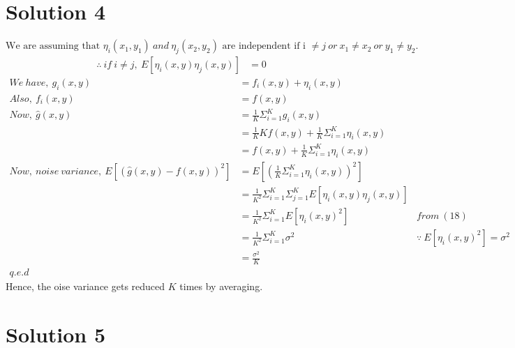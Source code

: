 \documentclass[a4paper,fleqn,11pt]{article}
\theoremstyle{mytheor}
\begin{document}
\section*{Solution 4}
$\text{We are assuming that }\eta_i (x_1, y_1)\ and\ \eta_j (x_2, y_2)\text{ are independent if i }\neq j\ or\ x_1 \neq x_2\ or\ y_1 \neq y_2.$
\begin{align}
\therefore\ if\ i \neq j,\ E[\eta_i(x, y)\eta_j(x, y)] & = 0
\end{align}
\begin{align*}
We\ have,\ g_i(x, y) & = f_i(x, y) + \eta_i(x, y) \\
Also,\ f_i(x, y) & = f(x, y) \\
Now,\ \hat{g}(x, y)& = \frac{1}{K} \Sigma_{i = 1}^K g_i(x, y) \\
& = \frac{1}{K}K f(x, y) + \frac{1}{K}\Sigma_{i = 1}^K \eta_i(x, y) \\
& = f(x, y) + \frac{1}{K}\Sigma_{i = 1}^K \eta_i(x, y) \\
Now,\ noise\ variance,\ E[(\hat{g}(x, y) - f(x, y))^2] & = E[(\frac{1}{K}\Sigma_{i = 1}^K \eta_i(x, y))^2] \\
& = \frac{1}{K^2}\Sigma_{i = 1}^K\Sigma_{j = 1}^K E[\eta_i(x, y)\eta_j(x, y)] \\
& = \frac{1}{K^2}\Sigma_{i = 1}^K E[\eta_i(x, y)^2] & from\ (18) \\
& = \frac{1}{K^2}\Sigma_{i = 1}^K \sigma^2 & \because\ E[\eta_i(x, y)^2] = \sigma^2 \\
& = \frac{\sigma^2}{K} \\
q.e.d
\end{align*}
Hence, the oise variance gets reduced $K$ times by averaging.

\section*{Solution 5}
\end{document}
